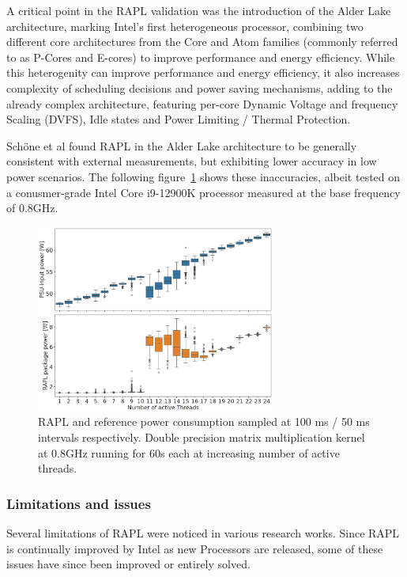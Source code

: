 A critical point in the RAPL validation was the introduction of the Alder Lake architecture, marking Intel's first heterogeneous processor, combining two different core architectures from the Core and Atom families (commonly referred to as P-Cores and E-cores) to improve performance and energy efficiency. While this heterogenity can improve performance and energy efficiency, it also increases complexity of scheduling decisions and power saving mechanisms, adding to the already complex architecture, featuring per-core Dynamic Voltage and frequency Scaling (DVFS), Idle states and Power Limiting / Thermal Protection.

Schöne et al\parencite{schone2024energy} found RAPL in the Alder Lake architecture to be generally consistent with external measurements, but exhibiting lower accuracy in low power scenarios. The following figure~\ref{fig:rapl_vs_PSU_validation} shows these inaccuracies, albeit tested on a conusmer-grade Intel Core i9-12900K processor measured at the base frequency of 0.8GHz.
\begin{figure}[ht]
    \centering
    \includegraphics[width=0.7\textwidth]{Figures/rapl_vs_PSU_validation.png}
    \caption[RAPL validation: CPU vs. PSU]{RAPL and reference power consumption sampled at 100 ms / 50 ms intervals respectively. Double precision matrix multiplication kernel at 0.8GHz running for 60s each at increasing number of active threads\parencite{schone2024energy}.}
    \label{fig:rapl_vs_PSU_validation}
\end{figure}

\subsubsection{Limitations and issues}
\label{sec:rapllimitations}
Several limitations of RAPL were noticed in various research works. Since RAPL is continually improved by Intel as new Processors are released, some of these issues have since been improved or entirely solved. 

